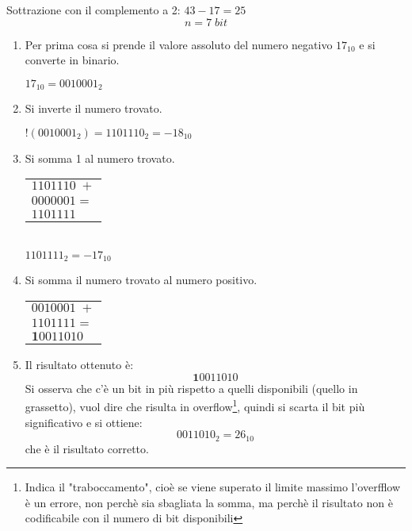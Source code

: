 \documentclass[a4paper]{article}
\theoremstyle{break}
\theoremstyle{break}
\theoremstyle{break}
\theoremstyle{break}
\begin{document}
\begin{example}
	Sottrazione con il complemento a 2: \( 43-17=25 \)
	\[
		n=7 \; bit
	\]
	\begin{enumerate}
		\item Per prima cosa si prende il valore assoluto del numero negativo
		      \( 17_{10} \) e si converte in binario.
		      \begin{center}
			      \( 17_{10}=0010001_{2} \)
		      \end{center}
		\item Si inverte il numero trovato.
		      \begin{center}
			      \( !(0010001_2) = 1101110_2 = -18_{10} \)
		      \end{center}
		\item Si somma 1 al numero trovato.
		      \begin{center}
			      \begin{tabular}{l}
				      \( 1101110\; + \) \\
				      \( 0000001 = \)   \\
				      \hline
				      \( 1101111 \)
			      \end{tabular}\\
			      \( 1101111_2 = -17_{10} \)
		      \end{center}
		\item Si somma il numero trovato al numero positivo.
		      \begin{center}
			      \begin{tabular}{l}
				      \( 0010001\; + \) \\
				      \( 1101111 = \)   \\
				      \hline
				      \( \textbf{1}0011010 \)
			      \end{tabular}
		      \end{center}
		\item Il risultato ottenuto è: \[
			      \textbf{1}0011010
		      \] Si osserva che c'è un bit in più rispetto a quelli disponibili (quello
		      in grassetto),
		      vuol dire che risulta in overflow\footnote{Indica il "traboccamento",
			      cioè se viene superato il limite massimo l'overfflow è un errore,
			      non perchè sia sbagliata la somma, ma perchè il risultato non è codificabile
			      con il numero di bit disponibili}, quindi si scarta il bit più significativo e
		      si ottiene:\[
			      0011010_2 = 26_{10}
		      \] che è il risultato corretto.
	\end{enumerate}
\end{example}
\end{document}
